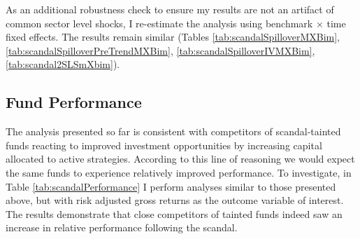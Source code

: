 \documentclass[openany]{book}
\theoremstyle{definition}
\theoremstyle{definition}
\theoremstyle{definition}
\theoremstyle{remark}
\begin{document}
As an additional robustness check to ensure my results are not an
artifact of common sector level shocks, I re-estimate the analysis using
benchmark \(\times\) time fixed effects. The results remain similar
(Tables \ref{tab:scandalSpilloverMXBim},
\ref{tab:scandalSpilloverPreTrendMXBim},
\ref{tab:scandalSpilloverIVMXBim}, \ref{tab:scandal2SLSmXbim}).

\subsection{Fund Performance}

The analysis presented so far is consistent with competitors of
scandal-tainted funds reacting to improved investment opportunities by
increasing capital allocated to active strategies. According to this
line of reasoning we would expect the same funds to experience
relatively improved performance. To investigate, in Table
\ref{tab:scandalPerformance} I perform analyses similar to those
presented above, but with risk adjusted gross returns as the outcome
variable of interest. The results demonstrate that close competitors of
tainted funds indeed saw an increase in relative performance following
the scandal.
\end{document}
